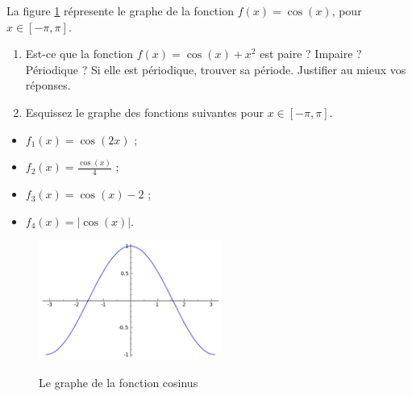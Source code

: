 
\begin{exercice}\label{exoDS2012-2-0001}


La figure \ref{graphecos} r\'epresente le graphe de la fonction $f(x)=\cos(x)$, pour $x\in[-\pi,\pi]$. 

\begin{enumerate}
\item Est-ce que la fonction $f(x)=\cos(x)+x^2$ est paire ? Impaire ? P\'eriodique ? Si elle est p\'eriodique, trouver sa p\'eriode. Justifier au mieux vos r\'eponses.
\item Esquissez le graphe des fonctions suivantes pour $x\in[-\pi,\pi]$. 
\end{enumerate}

\begin{multicols}{1}
  \begin{itemize}
    \renewcommand{\labelitemi}{$\bullet$}
  \item $f_1(x)=\cos(2x)$ ;
  \item $f_2(x)=\frac{\cos(x)}{4}$ ;
  \item $f_3(x)=\cos(x)-2$ ;
  \item $f_4(x)=|\cos(x)|$.
  \end{itemize}
\end{multicols}

\begin{figure}[h]
  \begin{center}
     \caption{Le graphe de la fonction cosinus}
   \includegraphics[width=6cm]{cos.png}\label{graphecos}
  \end{center}
 
\end{figure}

\end{exercice}

